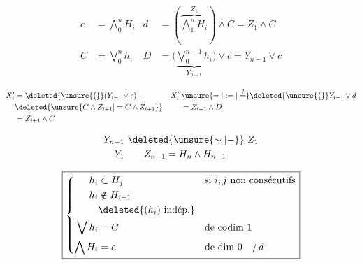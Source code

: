 \[
\begin{aligned}
c&=\bigwedge_0^n H_i &d&=(\overbrace{\bigwedge_1^n H_i}^{Z_1})\wedge C=Z_1\wedge C\\
C&=\bigvee_0^n h_i &D&=\bigl(\underbrace{\bigvee_0^{n-1}h_i}_{Y_{n-1}}\bigr)\vee c=Y_{n-1}\vee c
\end{aligned}
\]

\[
\begin{aligned}
X'_i&=\deleted{\unsure{\bigl(}}(Y_{i-1}\vee c)- & X''_i&\unsure{=|:=|\overset{?}{=}}\deleted{\unsure{\{} }Y_{i-1}\vee d\\
&\deleted{\unsure{C\wedge Z_{i+1}|=C\wedge Z_{i+1}}}& &= Z_{i+1}\wedge D\\
&=Z_{i+1}\wedge C
\end{aligned}
\]

\[
\begin{aligned}
Y_{n-1}&\ \deleted{\unsure{\sim|-}}\ Z_1\\
Y_1&\qquad Z_{n-1}=H_n\wedge H_{n-1}
\end{aligned}
\]


\[
\boxed{\left\{\begin{aligned}
 h_i&\subset H_j &&\text{si }i,j\ \text{non consécutifs}\\
 h_i&\notin H_{i+1}\\
 &\deleted{(h_i)\ \text{indép.}}\\
 \bigvee h_i&=C &&\text{de codim }1\\
 \bigwedge H_i&=c &&\text{de dim }0\quad /\,d
\end{aligned}\right.}
\]



